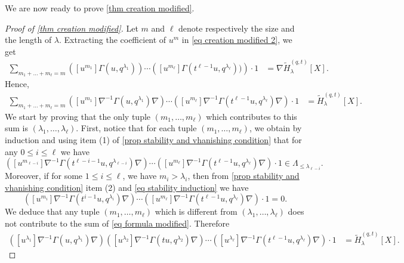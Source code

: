 \documentclass[12pt]{amsart}
\theoremstyle{remark}
\newcommand{\tH}{\widetilde{H}^{(q,t)}}
\begin{document}
We are now ready to prove \cref{thm creation modified}.
\begin{proof}[Proof of \cref{thm creation modified}]
    Let $m$ and $\ell$ denote respectively the size and the length of $\lambda$. Extracting the coefficient of $u^m$ in  \cref{eq creation modified 2}, we get 
\begin{align}
	\sum_{m_1+\dots+m_\ell=m}\left([u^{m_1}]\Gamma(u,q^{\lambda_1})\right)\cdots \left([u^{m_\ell}]\Gamma(t^{\ell-1}u,q^{\lambda_{\ell}}))\right)\cdot 1 & =\nabla \tH_\lambda[X].
\end{align}
Hence,
\begin{align}\label{eq formula modified}	\sum_{m_1+\dots+m_\ell=m}\left([u^{m_1}]\nabla^{-1}\Gamma(u,q^{\lambda_1})\nabla\right)\cdots \left([u^{m_\ell}]\nabla^{-1}\Gamma(t^{\ell-1}u,q^{\lambda_{\ell}})\nabla\right)\cdot 1 & =\tH_\lambda[X].
\end{align}
We start by proving that the only tuple $(m_1,\dots,m_\ell)$ which contributes to this sum is $(\lambda_1,\dots,\lambda_\ell).$
First, notice that for each tuple $(m_1,\dots,m_{\ell})$, we obtain by induction and using item (1) of \cref{prop stability and vhanishing condition} that for any $0\leq i \leq \ell$ we have
\begin{equation}\label{eq stability induction}
  \left([u^{m_{\ell-i}}]\nabla^{-1}\Gamma(t^{\ell-i-1}u,q^{\lambda_{\ell-i}})\nabla\right)\cdots \left([u^{m_\ell}]\nabla^{-1}\Gamma(t^{\ell-1}u,q^{\lambda_{\ell}})\nabla\right)\cdot 1\in \Lambda_{\leq \lambda_{\ell-i}}.  
\end{equation}
Moreover, if for some $1\leq i\leq \ell$, we have $m_i>\lambda_i$, then from \cref{prop stability and vhanishing condition} item (2) and \cref{eq stability induction} we have  
\begin{equation}
  \left([u^{m_{i}}]\nabla^{-1}\Gamma(t^{i-1}u,q^{\lambda_{i}})\nabla\right)\cdots \left([u^{m_\ell}]\nabla^{-1}\Gamma(t^{\ell-1}u,q^{\lambda_{\ell}})\nabla\right)\cdot 1=0.  
\end{equation}
We deduce that any tuple $(m_1,\dots,m_\ell)$ which is different from $(\lambda_1,\dots,\lambda_\ell)$ does not contribute to the sum of \cref{eq formula modified}. 
Therefore
\begin{align*}
\left([u^{\lambda_1}]\nabla^{-1}\Gamma(u,q^{\lambda_1})\nabla\right)
\left([u^{\lambda_2}]\nabla^{-1}\Gamma(tu,q^{\lambda_2})\nabla\right)\cdots \left([u^{\lambda_\ell}]\nabla^{-1}\Gamma(t^{\ell-1}u,q^{\lambda_{\ell}})\nabla\right)\cdot 1 & =\tH_\lambda[X].
\end{align*}

\end{proof}
\end{document}
